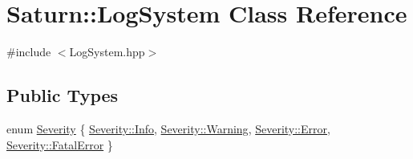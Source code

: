 \hypertarget{class_saturn_1_1_log_system}{}\section{Saturn\+:\+:Log\+System Class Reference}
\label{class_saturn_1_1_log_system}


{\ttfamily \#include $<$Log\+System.\+hpp$>$}

\subsection*{Public Types}
\begin{DoxyCompactItemize}
\item 
enum \mbox{\hyperlink{class_saturn_1_1_log_system_ab10c0f79f5466d3e47d56b857d09bdde}{Severity}} \{ \mbox{\hyperlink{class_saturn_1_1_log_system_ab10c0f79f5466d3e47d56b857d09bddea4059b0251f66a18cb56f544728796875}{Severity\+::\+Info}}, 
\mbox{\hyperlink{class_saturn_1_1_log_system_ab10c0f79f5466d3e47d56b857d09bddea0eaadb4fcb48a0a0ed7bc9868be9fbaa}{Severity\+::\+Warning}}, 
\mbox{\hyperlink{class_saturn_1_1_log_system_ab10c0f79f5466d3e47d56b857d09bddea902b0d55fddef6f8d651fe1035b7d4bd}{Severity\+::\+Error}}, 
\mbox{\hyperlink{class_saturn_1_1_log_system_ab10c0f79f5466d3e47d56b857d09bddeaf245a0dc66dc8cd7d835771034eb4b86}{Severity\+::\+Fatal\+Error}}
 \}
\end{DoxyCompactItemize}
